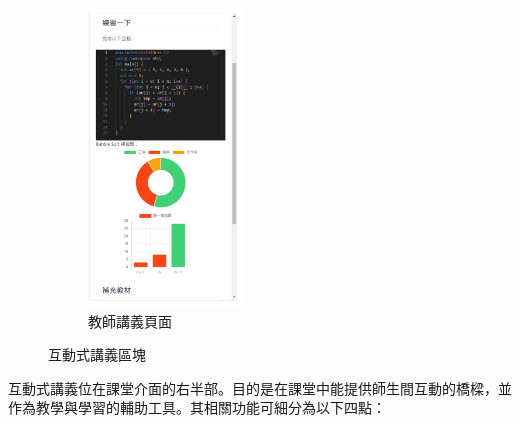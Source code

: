 \begin{figure}[H]
\begin{subfigure}{0.5\linewidth}
    \includegraphics[width=0.45\textwidth]{images/side-t.png}
    \caption{教師講義頁面}
    \label{fig:teacher}
  \end{subfigure}
  \caption{互動式講義區塊}
\end{figure}

互動式講義位在課堂介面的右半部。目的是在課堂中能提供師生間互動的橋樑，並作為教學與學習的輔助工具。其相關功能可細分為以下四點：

